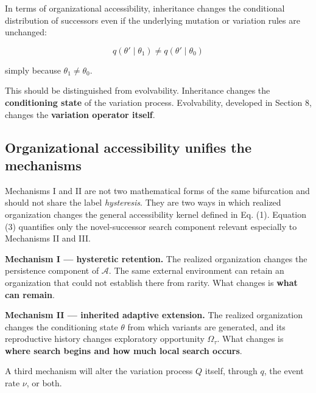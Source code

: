 \documentclass[11pt,a4paper]{article}
\begin{document}
In terms of organizational accessibility, inheritance changes the
conditional distribution of successors even if the underlying mutation
or variation rules are unchanged:

\[
q(\theta'\mid\theta_1)
\neq
q(\theta'\mid\theta_0)
\]

simply because \(\theta_1\neq\theta_0\).

This should be distinguished from evolvability. Inheritance changes the
\textbf{conditioning state} of the variation process. Evolvability,
developed in Section 8, changes the \textbf{variation operator itself}.

\subsection{Organizational accessibility unifies the
mechanisms}\label{organizational-accessibility-unifies-the-mechanisms}

Mechanisms I and II are not two mathematical forms of the same
bifurcation and should not share the label \emph{hysteresis}. They are
two ways in which realized organization changes the general
accessibility kernel defined in Eq. (1). Equation (3) quantifies only
the novel-successor search component relevant especially to Mechanisms
II and III.

\textbf{Mechanism I --- hysteretic retention.} The realized organization
changes the persistence component of \(\mathcal A\). The same external
environment can retain an organization that could not establish there
from rarity. What changes is \textbf{what can remain}.

\textbf{Mechanism II --- inherited adaptive extension.} The realized
organization changes the conditioning state \(\theta\) from which
variants are generated, and its reproductive history changes exploratory
opportunity \(\Omega_\tau\). What changes is \textbf{where search begins
and how much local search occurs}.

A third mechanism will alter the variation process \(Q\) itself, through
\(q\), the event rate \(\nu\), or both.
\end{document}
